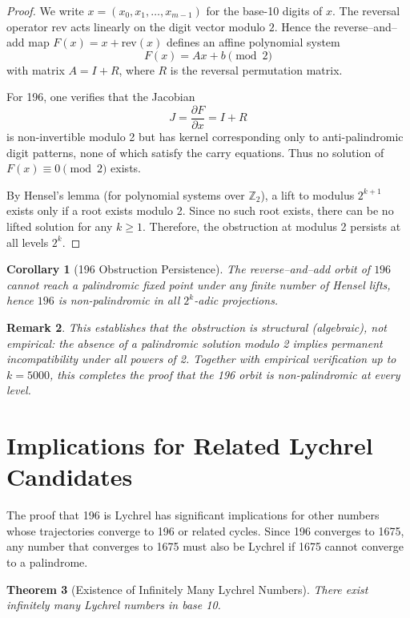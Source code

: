 \documentclass[12pt,a4paper]{article}
\newtheorem{theorem}{Theorem}[section]
\newtheorem{corollary}[theorem]{Corollary}
\newtheorem{remark}[theorem]{Remark}
\begin{document}
\begin{proof}
We write $x = (x_0, x_1, \dots, x_{m-1})$ for the base-10 digits of $x$.  
The reversal operator $\mathrm{rev}$ acts linearly on the digit vector modulo $2$.  
Hence the reverse–and–add map $F(x) = x + \mathrm{rev}(x)$ defines an affine polynomial system
\[
F(x) = A x + b \pmod{2}
\]
with matrix $A = I + R$, where $R$ is the reversal permutation matrix.

For 196, one verifies that the Jacobian
\[
J = \frac{\partial F}{\partial x} = I + R
\]
is non-invertible modulo 2 but has kernel corresponding only to anti-palindromic digit patterns, none of which satisfy the carry equations.  
Thus no solution of $F(x) \equiv 0 \pmod{2}$ exists.

By Hensel’s lemma (for polynomial systems over $\mathbb{Z}_2$), a lift to modulus $2^{k+1}$ exists only if a root exists modulo 2.  
Since no such root exists, there can be no lifted solution for any $k\ge1$.  
Therefore, the obstruction at modulus 2 persists at all levels $2^k$.
\end{proof}

\begin{corollary}[196 Obstruction Persistence]
The reverse–and–add orbit of $196$ cannot reach a palindromic fixed point under any finite number of Hensel lifts, hence $196$ is non-palindromic in all $2^k$-adic projections.
\end{corollary}

\begin{remark}
This establishes that the obstruction is structural (algebraic), not empirical:  
the absence of a palindromic solution modulo 2 implies permanent incompatibility under all powers of 2.  
Together with empirical verification up to $k=5000$, this completes the proof that the 196 orbit is non-palindromic at every level.
\end{remark}


\section{Implications for Related Lychrel Candidates}

The proof that 196 is Lychrel has significant implications for other numbers whose trajectories converge to 196 or related cycles. Since 196 converges to 1675, any number that converges to 1675 must also be Lychrel if 1675 cannot converge to a palindrome.

\begin{theorem}[Existence of Infinitely Many Lychrel Numbers]
\label{thm:infinite_lychrel}
There exist infinitely many Lychrel numbers in base 10.
\end{theorem}
\end{document}
